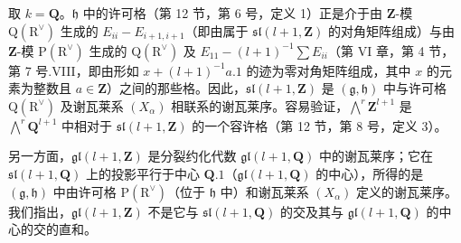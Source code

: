 取 \(k = \mathbf{Q}\)。\(\mathfrak{h}\) 中的许可格（第 12 节，第 6 号，定义 1）正是介于由 \(\mathbf{Z}\)-模 \(\mathrm{Q}(\mathrm{R}^{\vee})\) 生成的 \(E_{ii} - E_{i+1,i+1}\)（即由属于 \(\mathfrak{sl}(l+1,\mathbf{Z})\) 的对角矩阵组成）与由 \(\mathbf{Z}\)-模 \(\mathrm{P}(\mathrm{R}^{\vee})\) 生成的 \(\mathrm{Q}(\mathrm{R}^{\vee})\) 及 \(E_{11} - (l+1)^{-1}\sum E_{ii}\)（第 VI 章，第 4 节，第 7 号.VIII，即由形如 \(x + (l+1)^{-1}a.1\) 的迹为零对角矩阵组成，其中 \(x\) 的元素为整数且 \(a\in\mathbf{Z}\)）之间的那些格。因此，\(\mathfrak{sl}(l+1,\mathbf{Z})\) 是 \((\mathfrak{g},\mathfrak{h})\) 中与许可格 \(\mathrm{Q}(\mathrm{R}^{\vee})\) 及谢瓦莱系 \((X_{\alpha})\) 相联系的谢瓦莱序。容易验证，\(\bigwedge^{r}\mathbf{Z}^{l+1}\) 是 \(\bigwedge^{r}\mathbf{Q}^{l+1}\) 中相对于 \(\mathfrak{sl}(l+1,\mathbf{Z})\) 的一个容许格（第 12 节，第 8 号，定义 3）。

另一方面，\(\mathfrak{gl}(l+1,\mathbf{Z})\) 是分裂约化代数 \(\mathfrak{gl}(l+1,\mathbf{Q})\) 中的谢瓦莱序；它在 \(\mathfrak{sl}(l+1,\mathbf{Q})\) 上的投影平行于中心 \(\mathbf{Q}.1\)（\(\mathfrak{gl}(l+1,\mathbf{Q})\) 的中心），所得的是 \((\mathfrak{g},\mathfrak{h})\) 中由许可格 \(\mathrm{P}(\mathrm{R}^{\vee})\)（位于 \(\mathfrak{h}\) 中）和谢瓦莱系 \((X_{\alpha})\) 定义的谢瓦莱序。我们指出，\(\mathfrak{gl}(l+1,\mathbf{Z})\) 不是它与 \(\mathfrak{sl}(l+1,\mathbf{Q})\) 的交及其与 \(\mathfrak{gl}(l+1,\mathbf{Q})\) 的中心的交的直和。
\relax{}
